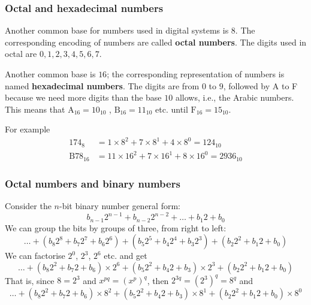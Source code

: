 % 
\begin{frame}
\frametitle{Octal and hexadecimal numbers}

Another common base for numbers used in digital systems is \(8\). The
corresponding encoding of numbers are called \textbf{octal
  numbers}. The digits used in octal are \(0, 1, 2, 3, 4, 5, 6, 7\).

\bigskip

Another common base is \(16\); the corresponding representation of
numbers is named \textbf{hexadecimal numbers}. The digits are from
\(0\) to \(9\), followed by A to F because we need more digits than
the base \(10\) allows, i.e., the Arabic numbers. This means that
\(\text{A}_{16} = 10_{10}\) , \(\text{B}_{16} = 11_{10}\) etc. until
\(\text{F}_{16} = 15_{10}\).

\bigskip

For example
\begin{align*}
174_8    &= 1 \times 8^2 + 7 \times 8^1 + 4 \times 8^0 = 124_{10}\\
\text{B}78_{16} &= 11 \times 16^2 + 7 \times 16^1 + 8 \times 16^0 =
2936_{10}
\end{align*}

\end{frame}

% 
\begin{frame}
\frametitle{Octal numbers and binary numbers}

Consider the \(n\)-bit binary number general form:
\[
b_{n-1} 2^{n-1} + b_{n-2} 2^{n-2} + \dots + b_1 2 + b_0
\]
We can group the bits by groups of three, from right to left:
\[
\dots + (b_8 2^8 + b_7 2^7 + b_6 2^6) + (b_5 2^5 + b_4 2^4 + b_3 2^3)
+ (b_2 2^2 + b_1 2 + b_0) 
\]
We can factorise \(2^0\), \(2^3\), \(2^6\) etc. and get
\[
\dots + (b_8 2^2 + b_7 2 + b_6) \times 2^6 + (b_5 2^2 + b_4 2 + b_3)
\times 2^3 + (b_2 2^2 + b_1 2 + b_0)
\]
That is, since \(8 = 2^3\) and \(x^{pq} = (x^p)^q\), then
\(2^{3q} = (2^3)^q = 8^q\) and 
\[
\dots + (b_8 2^2 + b_7 2 + b_6) \times 8^2 + (b_5 2^2 + b_4 2 + b_3)
\times 8^1 + (b_2 2^2 + b_1 2 + b_0) \times 8^0
\]

\end{frame}

